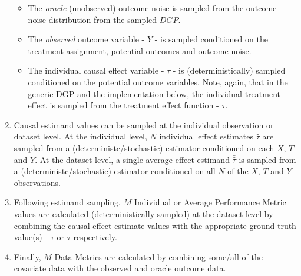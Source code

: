 \documentclass[../main.tex]{subfiles}
\begin{document}
\begin{enumerate}
\begin{itemize}
   \item The \textit{oracle} (unobserved) outcome noise is sampled from the outcome noise distribution from the sampled $DGP$.

   \item The \textit{observed} outcome variable - $Y$ - is sampled conditioned on the treatment assignment, potential outcomes and outcome noise.
    
   \item The individual causal effect variable - $\tau$ - is (deterministically) sampled conditioned on the potential outcome variables. Note, again, that in the generic DGP and the implementation below, the individual treatment effect is sampled from the treatment effect function - $\tau$.
  
\end{itemize}

\item Causal estimand values can be sampled at the individual observation or dataset level. At the individual level, $N$ individual effect estimates $\hat{\tau}$ are sampled from a (deterministc/stochastic) estimator conditioned on each $X$, $T$ and $Y$. At the dataset level, a single average effect estimand $\bar{\hat{\tau}}$ is sampled from a (deterministc/stochastic) estimator conditioned on all $N$ of the $X$, $T$ and $Y$ observations.

\item Following estimand sampling, $M$ Individual or Average Performance Metric values are calculated (deterministically sampled) at the dataset level by combining the causal effect estimate values with the appropriate ground truth value(s) - $\tau$ or $\bar{\tau}$ respectively.

\item Finally, $M$ Data Metrics are calculated by combining some/all of the covariate data with the observed and oracle outcome data.

\end{enumerate}
\end{document}

